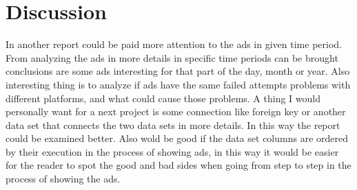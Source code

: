 \documentclass[fleqn,moreauthors,10pt]{ds_report}
\begin{document}
\FloatBarrier



\section*{Discussion}

In another report could be paid more attention to the ads in given time period. From analyzing the ads in more details in specific time periods can be brought conclusions are some ads interesting for that part of the day, month or year. Also interesting thing is to analyze if ads have the same failed attempts problems with different platforms, and what could cause those problems. A thing I would personally want for a next project is some connection like foreign key or another data set that connects the two data sets in more details. In this way the report could be examined better. Also wold be good if the data set columns are ordered by their execution in the process of showing ads, in this way it would be easier for the reader to spot the good and bad sides when going from step to step in the process of showing the ads.


\end{document}
